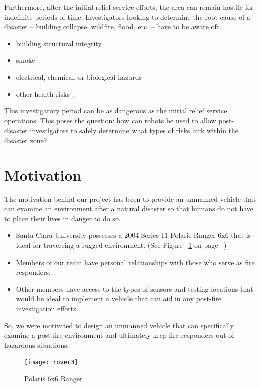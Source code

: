 Furthermore, after the initial relief service efforts, the area can remain hostile for indefinite periods of time.  Investigators looking to determine the root cause of a disaster -- building collapse, wildfire, flood, etc. -- have to be aware of:
\begin{itemize}
  \item building structural integrity
  \item smoke
  \item electrical, chemical, or biological hazards
  \item other health risks \cite{firearsonsceneevidence}.
\end{itemize}   This investigatory period can be as dangerous as the initial relief service operations. This poses the question: how can robots be used to allow post-disaster investigators to safely determine what types of risks lurk within the disaster zone?

\section{Motivation}
The motivation behind our project has been to provide an unmanned vehicle that can examine an environment after a natural disaster so that humans do not have to place their lives in danger to do so. 
\begin{itemize}
\item Santa Clara University possesses a 2004 Series 11 Polaris Ranger 6x6 that is ideal for traversing a rugged environment. (See Figure ~\ref{fig:rover3fig} on page ~\pageref{fig:rover3fig})
\item Members of our team have personal relationships with those who serve as fire responders.
\item Other members have access to the types of sensors and testing locations that would be ideal to implement a vehicle that can aid in any post-fire investigation efforts.
\end{itemize} 
So, we were motivated to design an unmanned vehicle that can specifically examine a post-fire environment and ultimately keep fire responders out of hazardous situations.

\begin{figure}[H]
\centering
\texttt{[image: rover3]}
\caption{Polaris 6x6 Ranger}
\label{fig:rover3fig}
\end{figure}

